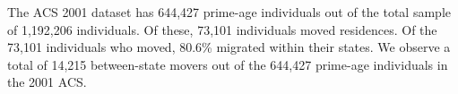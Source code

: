 The ACS 2001 dataset has 644,427 prime-age individuals out of the total sample of 1,192,206 individuals. Of these, 73,101 individuals moved residences. Of the 73,101 individuals who moved, 80.6\% migrated within their states. We observe a total of 14,215 between-state movers out of the 644,427 prime-age individuals in the 2001 ACS.